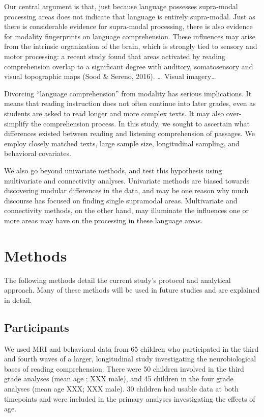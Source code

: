 Our central argument is that, just because language possesses supra-modal processing areas does not indicate that language is entirely supra-modal. Just as there is considerable evidence for supra-modal processing, there is also evidence for modality fingerprints on language comprehension. These influences may arise from the intrinsic organization of the brain, which is strongly tied to sensory and motor processing: a recent study found that areas activated by reading comprehension overlap to a significant degree with auditory, somatosensory and visual topographic maps (Sood \& Sereno, 2016). … Visual imagery… 

Divorcing “language comprehension” from modality has serious implications. It means that reading instruction does not often continue into later grades, even as students are asked to read longer and more complex texts. It may also over-simplify the comprehension process. 
In this study, we sought to ascertain what differences existed between reading and listening comprehension of passages. We employ closely matched texts, large sample size, longitudinal sampling, and behavioral covariates. 

We also go beyond univariate methods, and test this hypothesis using multivariate and connectivity analyses. Univariate methods are biased towards discovering modular differences in the data, and may be one reason why much discourse has focused on finding single supramodal areas. Multivariate and connectivity methods, on the other hand, may illuminate the influences one or more areas may have on the processing in these language areas. 


\section{Methods}

The following methods detail the current study's protocol and analytical approach. Many of these methods will be used in future studies and are explained in detail. 

\subsection{Participants}

We used MRI and behavioral data from 65 children who participated in the third and fourth waves of a larger, longitudinal study investigating the neurobiological bases of reading comprehension. There were 50 children involved in the third grade analyses (mean age ; XXX male), and 45 children in the four grade analyses (mean age XXX; XXX male). 30 children had usable data at both timepoints and were included in the primary analyses investigating the effects of age.

